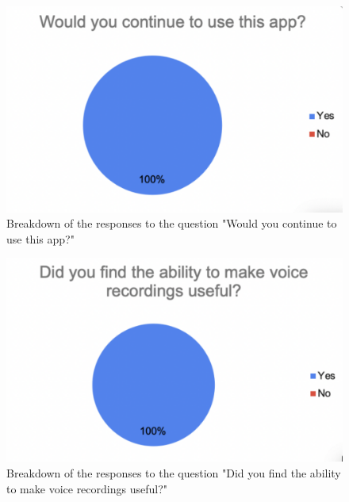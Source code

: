 \documentclass{l4proj}
\begin{document}
\begin{appendices}
\begin{figure}[H]
    \begin{centering}
    \includegraphics[scale=0.5]{images/userSurvey2.pdf}
    \caption{Breakdown of the responses to the question "Would you continue to use this app?"}
    \label{fig: userSurvey2}
    \end{centering}
\end{figure}

\begin{figure}[H]
    \begin{centering}
    \includegraphics[scale=0.5]{images/userSurvey3.pdf}
    \caption{Breakdown of the responses to the question "Did you find the ability to make voice recordings useful?"}
    \label{fig: userSurvey3}
    \end{centering}
\end{figure}


\end{appendices}
\end{document}
